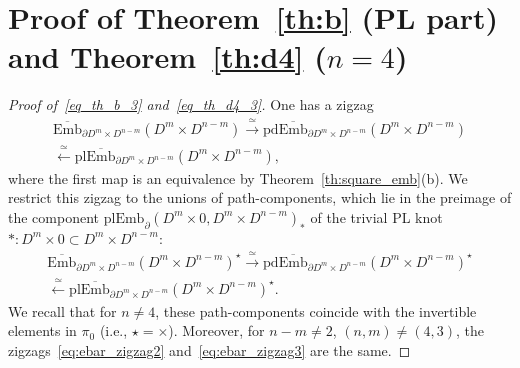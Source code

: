 \documentclass[11pt]{amsart}
\theoremstyle{definition}
\newcommand{\Ebar}{\overline{\mathrm{Emb}}}
\newcommand{\Emb}{\mathrm{Emb}}
\newcommand{\Imm}{\mathrm{Imm}}
\newcommand{\plImm}{\mathrm{plImm}}
\newcommand{\pdImm}{\mathrm{pdImm}}
\newcommand{\plEmb}{\mathrm{plEmb}}
\newcommand{\pdEmb}{\mathrm{pdEmb}}
\newcommand{\hofiber}{\mathrm{hofiber}}
\newcommand\rth{\refstepcounter{equation}}
\newcommand\numb{\rth{\rm \theequation}}
\numberwithin{equation}{section}
\begin{document}
\section{Proof of Theorem~\ref{th:b} (PL part) and Theorem~\ref{th:d4} ($n=4$)}\label{s:proof_B_PL}
\begin{proof}[Proof of~\eqref{eq_th_b_3} and~\eqref{eq_th_d4_3}]
One has a zigzag
\begin{multline}\label{eq:ebar_zigzag2}
\Ebar_{\partial D^m\times D^{n-m}}(D^m\times D^{n-m})\xrightarrow{\,\simeq\,}\mathrm{pd}\Ebar_{\partial D^m\times D^{n-m}}(D^m\times D^{n-m})\\
\xleftarrow{\,\simeq\,} \mathrm{pl}\Ebar_{\partial D^m\times D^{n-m}}(D^m\times D^{n-m}),
\end{multline}
where the first map is an equivalence by Theorem~\ref{th:square_emb}(b).
We restrict this zigzag to the unions of path-components, which lie in the preimage of the component $\plEmb_\partial(D^m\times 0,D^m\times D^{n-m})_*$ of the trivial PL knot
$*\colon D^m\times 0\subset D^m\times D^{n-m}$:
\begin{multline}\label{eq:ebar_zigzag3}
\Ebar_{\partial D^m\times D^{n-m}}(D^m\times D^{n-m})^\star\xrightarrow{\,\simeq\,}\mathrm{pd}\Ebar_{\partial D^m\times D^{n-m}}(D^m\times D^{n-m})^\star\\
\xleftarrow{\,\simeq\,} \mathrm{pl}\Ebar_{\partial D^m\times D^{n-m}}(D^m\times D^{n-m})^\star.
\end{multline}
We recall that for $n\neq 4$, these path-components coincide with the invertible elements in $\pi_0$ (i.e., $\star=\times$). Moreover, for $n-m\neq 2$, $(n,m)\neq (4,3)$, the zigzags~\eqref{eq:ebar_zigzag2} and~\eqref{eq:ebar_zigzag3}
are the same.


\end{proof}
\end{document}
